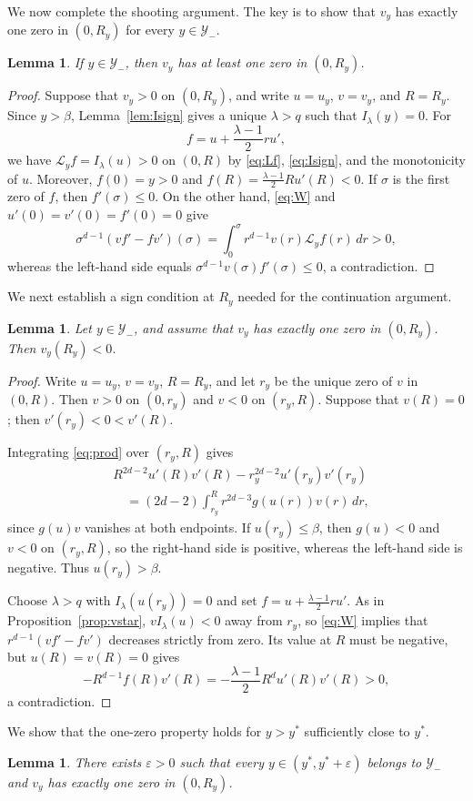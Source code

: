 \documentclass[12pt, a4paper, reqno]{amsart}
\numberwithin{equation}{section}
\newtheorem{lemma}[theorem]{Lemma}
\theoremstyle{definition}
\theoremstyle{remark}
\begin{document}
We now complete the shooting argument.
The key is to show that $v_y$ has exactly one zero in $(0,R_y)$ for every $y\in\mathcal Y_-$.

\begin{lemma}\label{lem:Szero}
If $y\in \mathcal Y_-$, then $v_y$ has at least one zero in $(0,R_y)$.
\end{lemma}

\begin{proof}
Suppose that $v_y>0$ on $(0,R_y)$, and write $u=u_y$, $v=v_y$, and
$R=R_y$. Since $y>\beta$, Lemma~\ref{lem:Isign} gives a unique
$\lambda>q$ such that $I_\lambda(y)=0$. For
\[
  f=u+\frac{\lambda-1}{2}ru',
\]
we have $\mathcal L_yf=I_\lambda(u)>0$ on $(0,R)$ by \eqref{eq:Lf}, \eqref{eq:Isign}, and the monotonicity of $u$.
Moreover, $f(0)=y>0$ and
$f(R)=\frac{\lambda-1}{2}Ru'(R)<0$. If $\sigma$ is the first zero of
$f$, then $f'(\sigma)\le0$. On the other hand, \eqref{eq:W} and
$u'(0)=v'(0)=f'(0)=0$ give
\[
  \sigma^{d-1}(vf'-fv')(\sigma)
  =\int_0^\sigma r^{d-1}v(r)\mathcal L_yf(r)\,dr>0,
\]
whereas the left-hand side equals
$\sigma^{d-1}v(\sigma)f'(\sigma)\le0$, a contradiction.
\end{proof}
We next establish a sign condition at $R_y$ needed for the continuation argument.
\begin{lemma}\label{lem:end}
Let $y\in \mathcal Y_-$, and assume that $v_y$ has exactly one zero in $(0,R_y)$.
Then $v_y(R_y)<0$.
\end{lemma}

\begin{proof}
Write $u=u_y$, $v=v_y$, $R=R_y$, and let $r_y$ be the unique zero of
$v$ in $(0,R)$. Then $v>0$ on $(0,r_y)$ and $v<0$ on $(r_y,R)$. Suppose that
$v(R)=0$; then $v'(r_y)<0<v'(R)$.

Integrating \eqref{eq:prod} over $(r_y,R)$ gives
\begin{align*}
& R^{2d-2}u'(R)v'(R)
  -r_y^{2d-2}u'(r_y)v'(r_y)\\
&\quad=(2d-2)\int_{r_y}^R r^{2d-3}g(u(r))v(r)\,dr,
\end{align*}
since $g(u)v$ vanishes at both endpoints. If $u(r_y)\le\beta$, then
$g(u)<0$ and $v<0$ on $(r_y,R)$, so the right-hand side is positive,
whereas the left-hand side is negative. Thus $u(r_y)>\beta$.

Choose $\lambda>q$ with $I_\lambda(u(r_y))=0$ and set
$f=u+\frac{\lambda-1}{2}ru'$. As in Proposition~\ref{prop:vstar},
$vI_\lambda(u)<0$ away from $r_y$, so \eqref{eq:W} implies that
$r^{d-1}(vf'-fv')$ decreases strictly from zero. Its value at $R$ must be
negative, but $u(R)=v(R)=0$ gives
\[
  -R^{d-1}f(R)v'(R)
  =-\frac{\lambda-1}{2}R^d u'(R)v'(R)>0,
\]
a contradiction.
\end{proof}
We show that the one-zero property holds
for $y>y^*$ sufficiently close to $y^*$.
\begin{lemma}%
\label{lem:right}
There exists $\varepsilon>0$ such that every
$y\in(y^*,y^*+\varepsilon)$ belongs to $\mathcal Y_-$ and $v_y$ has exactly one zero
in $(0,R_y)$.
\end{lemma}
\end{document}
